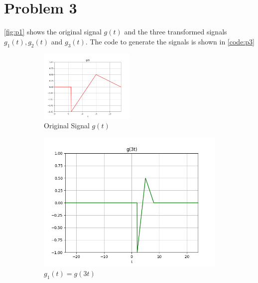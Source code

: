 \documentclass{article}
\begin{document}
\section{Problem 3}
\autoref{fig:p1} shows the original signal $g(t)$ and the three transformed signals $g_1(t), g_2(t)$ and $g_3(t)$. The code to generate the signals is shown in \autoref{code:p3}
\begin{figure}[ht!]
    \centering
    \begin{subfigure}{\textwidth}
        \centering
        \includegraphics[width=0.5\textwidth]{p1_1.png}
        \caption{Original Signal $g(t)$}
    \end{subfigure}
    \newline
    \begin{subfigure}{0.3\textwidth}
        \centering
        \includegraphics[width=\textwidth]{p1_2.png}
        \caption{$g_1(t) = g(3t)$}
    \end{subfigure}
    \begin{subfigure}{0.3\textwidth}
        \centering

\end{subfigure}
\end{figure}
\end{document}

